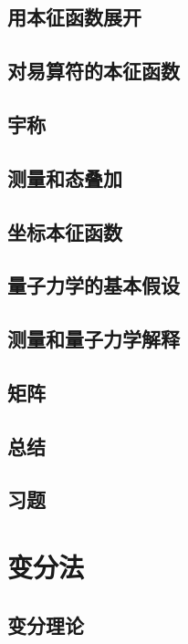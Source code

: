 \documentclass{book}
\begin{document}
	\section{用本征函数展开}
	
	\section{对易算符的本征函数}
	
	\section{宇称}
	
	\section{测量和态叠加}
	
	\section{坐标本征函数}
	
	\section{量子力学的基本假设}
	
	\section{测量和量子力学解释}
	
	\section{矩阵}
	
	\section*{总结}
	
	\section*{习题}
	
	\chapter{变分法}
	\section{变分理论}
	
\end{document}
